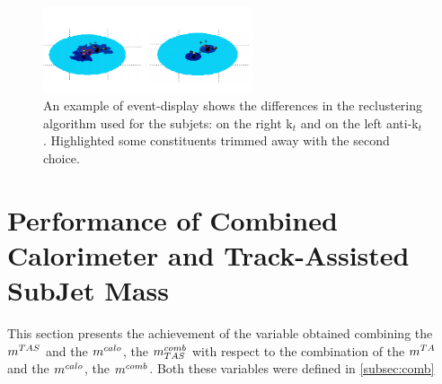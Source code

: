 \begin{figure}[!ht]
  \centering
      \includegraphics[width=0.55\textwidth]{jet_part/mtas/evtdspl.png}
  \caption[Different reclustering in event display]{An example of event-display shows the differences in the reclustering algorithm used for the subjets: on the right  k$_t$ and on the left anti-k$_t$. Highlighted some constituents trimmed away with the second choice.}
  \label{fig:evtdspl}
\end{figure}



   

   

   
\clearpage
\section{Performance of Combined Calorimeter and Track-Assisted SubJet Mass}
This section presents the achievement of the variable obtained combining the $m^{TAS}$ and the $m^{calo}$, the $m^{comb}_{TAS}$ with respect to the combination of the $m^{TA}$ and the $m^{calo}$, the $m^{comb}$. Both these variables were defined in \ref{subsec:comb}


